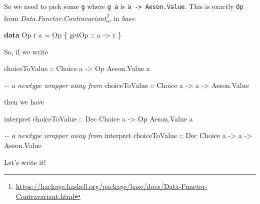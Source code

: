 \documentclass[]{article}
\newenvironment{Shaded}{}{}
\newcommand{\CommentTok}[1]{\textcolor[rgb]{0.38,0.63,0.69}{\textit{#1}}}
\newcommand{\DataTypeTok}[1]{\textcolor[rgb]{0.56,0.13,0.00}{#1}}
\newcommand{\KeywordTok}[1]{\textcolor[rgb]{0.00,0.44,0.13}{\textbf{#1}}}
\newcommand{\NormalTok}[1]{#1}
\newcommand{\OperatorTok}[1]{\textcolor[rgb]{0.40,0.40,0.40}{#1}}
\newcommand{\OtherTok}[1]{\textcolor[rgb]{0.00,0.44,0.13}{#1}}
\newcommand{\StringTok}[1]{\textcolor[rgb]{0.25,0.44,0.63}{#1}}
\renewcommand{\href}[2]{#2\footnote{\url{#1}}}
\begin{document}
So we need to pick some \texttt{g} where \texttt{g\ a} is
\texttt{a\ -\textgreater{}\ Aeson.Value}. This is exactly \texttt{Op} from
\emph{\href{https://hackage.haskell.org/package/base/docs/Data-Functor-Contravariant.html}{Data.Functor.Contravariant}},
in \emph{base}:

\begin{Shaded}
\begin{Highlighting}[]
\KeywordTok{data} \DataTypeTok{Op}\NormalTok{ r a }\OtherTok{=} \DataTypeTok{Op}\NormalTok{ \{}\OtherTok{ getOp ::}\NormalTok{ a }\OtherTok{{-}>}\NormalTok{ r \}}
\end{Highlighting}
\end{Shaded}

So, if we write

\begin{Shaded}
\begin{Highlighting}[]
\OtherTok{choiceToValue ::} \DataTypeTok{Choice}\NormalTok{ a }\OtherTok{{-}>} \DataTypeTok{Op} \DataTypeTok{Aeson.Value}\NormalTok{ a}

\CommentTok{{-}{-} a newtype wrapper away from}
\OtherTok{choiceToValue ::} \DataTypeTok{Choice}\NormalTok{ a }\OtherTok{{-}>}\NormalTok{ a }\OtherTok{{-}>} \DataTypeTok{Aeson.Value}
\end{Highlighting}
\end{Shaded}

then we have

\begin{Shaded}
\begin{Highlighting}[]
\NormalTok{interpret}\OtherTok{ choiceToValue ::} \DataTypeTok{Dec} \DataTypeTok{Choice}\NormalTok{ a }\OtherTok{{-}>} \DataTypeTok{Op} \DataTypeTok{Aeson.Value}\NormalTok{ a}

\CommentTok{{-}{-} a newtype wrapper away from}
\NormalTok{interpret}\OtherTok{ choiceToValue ::} \DataTypeTok{Dec} \DataTypeTok{Choice}\NormalTok{ a }\OtherTok{{-}>}\NormalTok{ a }\OtherTok{{-}>} \DataTypeTok{Aeson.Value}
\end{Highlighting}
\end{Shaded}

Let's write it!

\begin{Shaded}
\end{Shaded}
\end{document}
